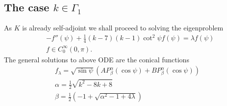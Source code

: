 \subsection*{The case $k\in\Gamma_1$}

As $K$ is already self-adjoint we shall proceed to solving the
eigenproblem
\begin{align}
  \label{eq:21}
  &-f''(\psi)+\frac{1}{4}(k-7)(k-1)\cot^2\psi f(\psi)=\lambda f(\psi)\\
  &f\in C^\infty_0(0,\pi).
\end{align}
The general solutions to above ODE are the conical functions
\begin{align}
  \label{eq:1}
  f_\lambda=\sqrt{\sin\psi}
  \left(AP_{\beta}^{\alpha}(\cos\psi)+BP_{\beta}^{\alpha}(\cos\psi)\right)\\
  \alpha=\frac{1}{2}\sqrt{k^2-8k+8}\\
  \beta=\frac{1}{2}\left(-1+\sqrt{\alpha^2-1+4\lambda}\right)
  \end{align}

